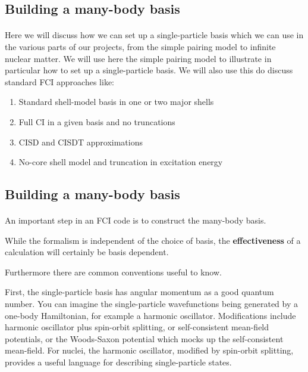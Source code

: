 \documentclass[%
oneside,                 %
final,                   %
10pt]{article}
\begin{document}
\noindent
\subsection*{Building a many-body basis}

\paragraph{}
Here we will discuss how we can set up a single-particle basis which we can use in the various parts of our projects, from the simple pairing model to infinite nuclear matter. We will use here the simple pairing model to illustrate in particular how to set up a single-particle basis. We will also use this do discuss standard FCI approaches like:
\begin{enumerate}
 \item Standard shell-model basis in one or two major shells

 \item Full CI in a given basis and no truncations

 \item CISD and CISDT approximations

 \item No-core shell model and truncation in excitation energy
\end{enumerate}

\noindent



\subsection*{Building a many-body basis}

\paragraph{}
An important step in an FCI code  is to construct the many-body basis.  

While the formalism is independent of the choice of basis, the \textbf{effectiveness} of a calculation 
will certainly be basis dependent. 

Furthermore there are common conventions useful to know.

First, the single-particle basis has angular momentum as a good quantum number.  You can 
imagine the single-particle wavefunctions being generated by a one-body Hamiltonian, 
for example a harmonic oscillator.  Modifications include harmonic oscillator plus 
spin-orbit splitting, or self-consistent mean-field potentials, or the Woods-Saxon potential which mocks 
up the self-consistent mean-field. 
For nuclei, the harmonic oscillator, modified by spin-orbit splitting, provides a useful language 
for describing single-particle states.
\end{document}
